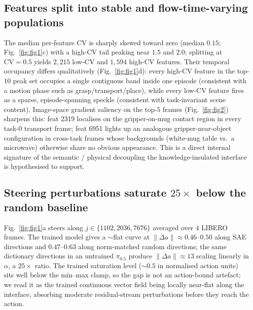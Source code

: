 \subsection{Features split into stable and flow-time-varying populations}
\label{ssec:exp_cv}
The median per-feature CV is sharply skewed toward zero (median $0.15$;
Fig.~\ref{fig:fig1}c) with a high-CV tail peaking near $1.5$ and $2.0$;
splitting at $\mathrm{CV}{=}0.5$ yields $2{,}215$ low-CV and $1{,}594$
high-CV features. Their temporal occupancy differs qualitatively
(Fig.~\ref{fig:fig1}d): every high-CV feature in the top-$10$ peak set
occupies a single contiguous band inside one episode (consistent with a
motion phase such as grasp/transport/place), while every low-CV feature
fires as a sparse, episode-spanning speckle (consistent with task-invariant
scene content). Image-space gradient saliency on the top-$5$ frames
(Fig.~\ref{fig:fig2}) sharpens this: feat 2319 localises on the
gripper-on-mug contact region in every task-0 transport frame; feat 6951
lights up an analogous gripper-near-object configuration in cross-task
frames whose backgrounds (white-mug table vs.\ a microwave) otherwise share
no obvious appearance. This is a direct internal signature of the
semantic / physical decoupling the knowledge-insulated interface is
hypothesised to support.

\subsection{Steering perturbations saturate $25\times$ below the random baseline}
\label{ssec:exp_steer}
Fig.~\ref{fig:fig1}a steers along $j\in\{1102,2036,7676\}$ averaged over $4$
LIBERO frames. The trained model gives a $\sim$flat curve at
$\|\Delta a\|{\approx}0.46$--$0.50$ along SAE directions and $0.47$--$0.63$
along norm-matched random directions; the same dictionary directions in an
untrained $\pi_{0.5}$ produce $\|\Delta a\|{\approx}13$ scaling linearly in
$\alpha$, a $25{\times}$ ratio. The trained saturation level ($\sim$$0.5$ in
normalised action units) sits well below the min--max clamp, so the gap is
not an action-bound artefact; we read it as the trained continuous vector
field being locally near-flat along the interface, absorbing moderate
residual-stream perturbations before they reach the action.
